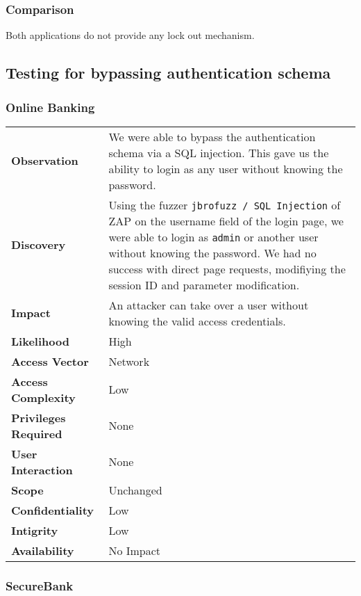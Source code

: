 \subsubsection*{Comparison}
Both applications do not provide any lock out mechanism.

\clearpage




\subsection{Testing for bypassing authentication schema}

\subsubsection*{Online Banking}

\begin{tabular}{l|p{10cm}}

\textbf{Observation} & We were able to bypass the authentication schema via a SQL injection. This gave us the ability to login as any user without knowing the password. \\
\textbf{Discovery} & Using the fuzzer \texttt{jbrofuzz / SQL Injection} of ZAP on the username field of the login page, we were able to login as \texttt{admin} or another user without knowing the password. We had no success with direct page requests, modifiying the session ID and parameter modification. \\
\textbf{Impact} & An attacker can take over a user without knowing the valid access credentials. \\
\textbf{Likelihood} & High \\
\textbf{Access Vector} & Network \\
\textbf{Access Complexity} & Low \\
\textbf{Privileges Required} & None \\
\textbf{User Interaction} & None \\
\textbf{Scope} & Unchanged \\
\textbf{Confidentiality} & Low \\
\textbf{Intigrity} & Low \\
\textbf{Availability} & No Impact \\
\end{tabular}

\subsubsection*{SecureBank}

